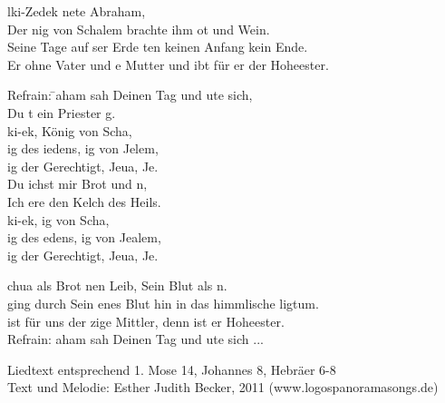 
lki-Zedek nete Abraham,\\
Der nig von Schalem brachte ihm ot und Wein.\\
Seine Tage auf ser Erde ten keinen Anfang  kein Ende.\\
Er  ohne Vater und e Mutter und ibt für er der Hoheester.

\begin{tabbing}
Refrain: \=     aham sah Deinen Tag und ute sich,\\
         \>               Du t ein Priester g.\\
         \>    ki-ek, König von Scha,\\
         \>    ig des iedens, ig von Jelem,\\
         \>    ig der Gerechtigt, Jeua, Je.\\
         \>               Du ichst mir Brot und n,\\
         \>              Ich ere den Kelch des Heils.\\
         \>    ki-ek, ig von Scha,\\
         \>    ig des edens, ig von Jealem,\\
         \>    ig der Gerechtigt, Jeua, Je.
\end{tabbing} 

chua  als Brot nen Leib, Sein Blut als n.\\
 ging durch Sein enes Blut hin in das himmlische ligtum.\\
 ist für uns der zige Mittler, denn  ist er Hoheester.\\

Refrain:     aham sah Deinen Tag und ute sich ...\\

\begin{footnotesize}
Liedtext entsprechend 1. Mose 14, Johannes 8, Hebräer 6-8 \\
Text und Melodie: Esther Judith Becker, 2011 (www.logospanoramasongs.de)
\end{footnotesize}